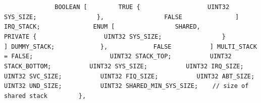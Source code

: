 {\lstinline!              BOOLEAN [! \newline
\lstinline!		   TRUE {! \newline
\lstinline!                  UINT32 SYS_SIZE;! \newline
\lstinline!                },! \newline
\lstinline!                FALSE! \newline
\lstinline!              ] IRQ_STACK;! \newline
\lstinline!              ENUM [! \newline
\lstinline!                SHARED,! \newline
\lstinline!                PRIVATE {! \newline
\lstinline!                  UINT32 SYS_SIZE;! \newline
\lstinline!                }! \newline
\lstinline!              ] DUMMY_STACK;! \newline
\lstinline!            },! \newline
\lstinline!            FALSE! \newline
\lstinline!          ] MULTI_STACK = FALSE;! \newline
\lstinline!          ! \newline
\lstinline!          UINT32 STACK_TOP;! \newline
\lstinline!          UINT32 STACK_BOTTOM;! \newline
\lstinline!          UINT32 SYS_SIZE;! \newline
\lstinline!          UINT32 IRQ_SIZE;! \newline
\lstinline!          UINT32 SVC_SIZE;! \newline
\lstinline!          UINT32 FIQ_SIZE;! \newline
\lstinline!          UINT32 ABT_SIZE;! \newline
\lstinline!          UINT32 UND_SIZE;! \newline
\lstinline!          UINT32 SHARED_MIN_SYS_SIZE;    // size of shared stack! \newline
\lstinline!! \newline
\lstinline!        },! \newline
}
